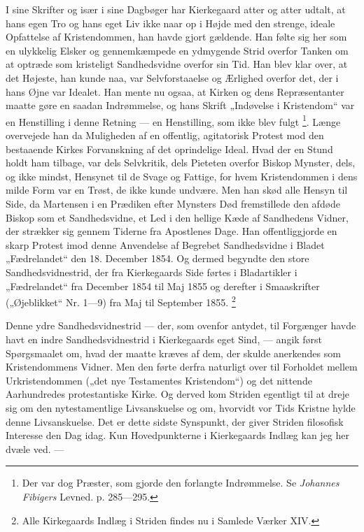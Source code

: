 \documentclass[12pt,a4paper,openany]{book}
\newcommand{\opage}[1]{\marginnote{\footnotesize\textit{[#1]}}}
\begin{document}
I sine Skrifter og især i sine Dagbøger har Kierkegaard atter og atter udtalt,
at hans egen Tro og hans eget Liv ikke naar op i Højde med den strenge, ideale
Opfattelse af Kristendommen, han havde gjort gældende. Han følte sig her som en
ulykkelig Elsker og gennemkæmpede en ydmygende Strid overfor Tanken om at
optræde som kristeligt Sandhedsvidne overfor sin Tid. Han blev klar over, at
det Højeste, han kunde naa, var Selvforstaaelse og Ærlighed overfor det, der i
hans Øjne var Idealet. Han mente nu ogsaa, at Kirken og dens Repræsentanter
maatte gøre en saadan Indrømmelse, og hans Skrift „Indøvelse i Kristendom“ var
en Henstilling i denne Retning --- en Henstilling, som ikke blev fulgt%
\footnote[1]{Der var dog Præster, som gjorde den forlangte Indrømmelse. Se
\emph{Johannes} \emph{Fibigers} Levned. p. 285---295.}. Længe overvejede han da
Muligheden af en offentlig, agitatorisk Protest mod den bestaaende Kirkes
Forvanskning af det oprindelige Ideal. Hvad der en Stund holdt ham tilbage, var
dels Selvkritik, dels Pieteten overfor Biskop Mynster, dels, og ikke mindst,
Hensynet til de Svage og Fattige, for hvem
\setcounter{footnote}{0}%
\opage{168}Kristendommen i dens milde Form var en Trøst, de ikke kunde undvære.
Men han skød alle Hensyn til Side, da Martensen i en Prædiken efter Mynsters
Død fremstillede den afdøde Biskop som et Sandhedsvidne, et Led i den hellige
Kæde af Sandhedens Vidner, der strækker sig gennem Tiderne fra Apostlenes Dage.
Han offentliggjorde en skarp Protest imod denne Anvendelse af Begrebet
Sandhedsvidne i Bladet „Fædrelandet“ den 18. December 1854. Og dermed begyndte
den store Sandhedsvidnestrid, der fra Kierkegaards Side førtes i Bladartikler i
„Fædrelandet“ fra December 1854 til Maj 1855 og derefter i Smaaskrifter
(„Øjeblikket“ Nr. 1---9) fra Maj til September 1855.%
\footnote[1]{Alle Kirkegaards Indlæg i Striden findes nu i Samlede Værker XIV.}

Denne ydre Sandhedsvidnestrid --- der, som ovenfor antydet, til Forgænger havde
havt en indre Sandhedsvidnestrid i Kierkegaards eget Sind, --- angik først
Spørgsmaalet om, hvad der maatte kræves af dem, der skulde anerkendes som
Kristendommens Vidner. Men den førte derfra naturligt over til Forholdet mellem
Urkristendommen („det nye Testamentes Kristendom“) og det nittende Aarhundredes
protestantiske Kirke. Og derved kom Striden egentligt til at dreje sig om den
nytestamentlige Livsanskuelse og om, hvorvidt vor Tids Kristne hylde denne
Livsanskuelse. Det er dette sidste Synspunkt, der giver Striden filosofisk
Interesse den Dag idag. Kun Hovedpunkterne i Kierkegaards Indlæg kan jeg her
dvæle ved. ---
\end{document}
